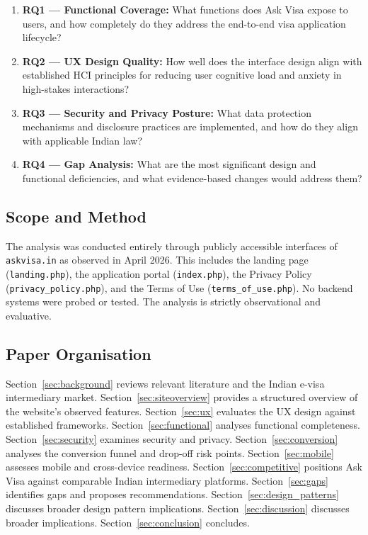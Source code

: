 \documentclass[journal, 10pt, twoside]{IEEEtran}
\begin{document}
\begin{enumerate}
  \item \textbf{RQ1 --- Functional Coverage:} What functions does Ask Visa
  expose to users, and how completely do they address the end-to-end visa
  application lifecycle?
  \item \textbf{RQ2 --- UX Design Quality:} How well does the interface
  design align with established HCI principles for reducing user cognitive
  load and anxiety in high-stakes interactions?
  \item \textbf{RQ3 --- Security and Privacy Posture:} What data protection
  mechanisms and disclosure practices are implemented, and how do they align
  with applicable Indian law?
  \item \textbf{RQ4 --- Gap Analysis:} What are the most significant
  design and functional deficiencies, and what evidence-based changes
  would address them?
\end{enumerate}

\subsection{Scope and Method}
The analysis was conducted entirely through publicly accessible interfaces
of \texttt{askvisa.in} as observed in April 2026. This includes the landing
page (\texttt{landing.php}), the application portal (\texttt{index.php}),
the Privacy Policy (\texttt{privacy\_policy.php}), and the Terms of Use
(\texttt{terms\_of\_use.php}). No backend systems were probed or tested.
The analysis is strictly observational and evaluative.

\subsection{Paper Organisation}
Section~\ref{sec:background} reviews relevant literature and the Indian
e-visa intermediary market. Section~\ref{sec:siteoverview} provides a
structured overview of the website's observed features.
Section~\ref{sec:ux} evaluates the UX design against established
frameworks. Section~\ref{sec:functional} analyses functional completeness.
Section~\ref{sec:security} examines security and privacy.
Section~\ref{sec:conversion} analyses the conversion funnel and
drop-off risk points. Section~\ref{sec:mobile} assesses mobile and
cross-device readiness. Section~\ref{sec:competitive} positions Ask Visa
against comparable Indian intermediary platforms. Section~\ref{sec:gaps}
identifies gaps and proposes recommendations. Section~\ref{sec:design_patterns}
discusses broader design pattern implications. Section~\ref{sec:discussion}
discusses broader implications. Section~\ref{sec:conclusion} concludes.
\end{document}
